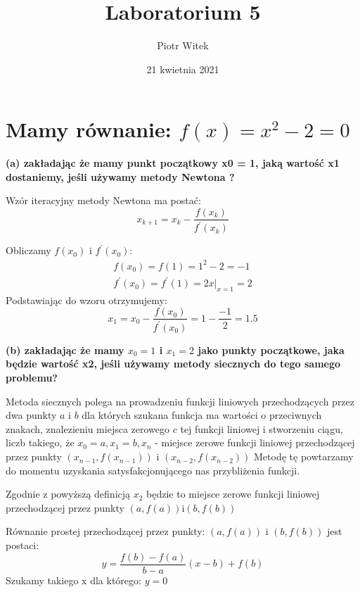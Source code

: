 \documentclass[5]{article}
\title{Laboratorium 5}
\author{Piotr Witek}
\date{21 kwietnia 2021}
\begin{document}

\maketitle


\section{Mamy równanie: $f(x) = x^2 - 2 = 0$}

\textbf{(a) zakładając że mamy punkt początkowy x0 = 1, jaką wartość x1 dostaniemy,
jeśli używamy metody Newtona ?}
\newline


Wzór iteracyjny metody Newtona ma postać:
$$x_{k+1}=x_{k}-\frac{f\left(x_{k}\right)}{f^{\prime}\left(x_{k}\right)}$$

Obliczamy  $f\left(x_{0}\right)$ i  $f^{\prime}\left(x_{0}\right)$:
$$
\begin{array}{l}
f\left(x_{0}\right)=f(1)=1^{2}-2=-1 \\
f^{\prime}\left(x_{0}\right)=f^{\prime}(1)=\left.2 x\right|_{x=1}=2
\end{array}
$$
\hspace{4mm} Podstawiając do wzoru otrzymujemy:
$$
x_{1}=x_{0}-\frac{f\left(x_{0}\right)}{f^{\prime}\left(x_{0}\right)}=1-\frac{-1}{2}=1.5
$$

\vspace{5mm}

\textbf{(b) zakładając że mamy $ x_0 = 1$ i $x_1 = 2$ jako punkty początkowe, jaka będzie wartość x2, jeśli używamy metody siecznych do tego samego problemu?}
\newline

Metoda siecznych polega na prowadzeniu funkcji liniowych przechodzących przez dwa punkty $a$ i $b$ dla których szukana funkcja ma wartości o przeciwnych znakach, znalezieniu miejsca zerowego $c$ tej funkcji liniowej i stworzeniu ciągu, liczb takiego, że $x_{0}=a, x_{1}=b, x_{n}$ - miejsce zerowe funkcji liniowej przechodzącej przez punkty $\left(x_{n-1}, f\left(x_{n-1}\right)\right)$ i $\left(x_{n-2}, f\left(x_{n-2}\right)\right)$ Metodę tę powtarzamy do momentu uzyskania satysfakcjonującego nas przybliżenia funkcji.

Zgodnie $\mathrm{z}$ powyższą definicją $x_{2}$ będzie to miejsce zerowe funkcji liniowej przechodzącej przez punkty $(a, f(a)) \mathrm{i}(b, f(b))$ 

\newline
Równanie prostej przechodzącej przez punkty: $(a, f(a))$ i $(b, f(b))$ jest postaci:
$$
y=\frac{f(b)-f(a)}{b-a}(x-b)+f(b)
$$
Szukamy takiego $\mathrm{x}$ dla którego: $y=0$
\end{document}
